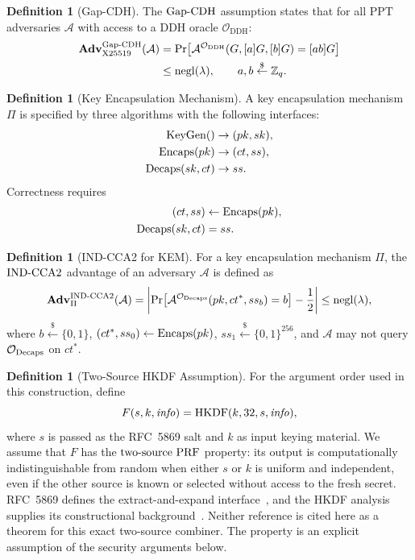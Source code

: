 \documentclass[preprint,12pt]{elsarticle}
\theoremstyle{definition}
\newtheorem{definition}[theorem]{Definition}
\newcommand{\tech}[1]{\textnormal{#1}}
\newcommand{\secpar}{\lambda}
\newcommand{\negl}{\mathrm{negl}}
\newcommand{\ppt}{\mathrm{PPT}}
\newcommand{\adv}{\mathbf{Adv}}
\newcommand{\advA}{\mathcal{A}}
\newcommand{\oracle}{\mathcal{O}}
\newcommand{\HKDF}{\tech{HKDF}}
\renewcommand{\DH}{\tech{X25519}}
\newcommand{\KeyGen}{\tech{KeyGen}}
\newcommand{\Encaps}{\tech{Encaps}}
\newcommand{\Decaps}{\tech{Decaps}}
\newcommand{\GapCDH}{\tech{Gap-CDH}}
\newcommand{\INDCCA}{\tech{IND-CCA2}}
\newcommand{\twoSourcePRF}{\tech{two-source PRF}}
\newcommand{\getsr}{\stackrel{\$}{\gets}}
\begin{document}
\begin{definition}[Gap-CDH]\label{def:gap-cdh}
The $\GapCDH$ assumption states that for all $\ppt$ adversaries $\advA$ with access to a DDH oracle $\oracle_{\mathrm{DDH}}$:
\begin{align}
  \adv^{\GapCDH}_{\DH}(\advA)
  &=
  \Pr\!\left[
    \advA^{\oracle_{\mathrm{DDH}}}(G,[a]G,[b]G) = [ab]G
  \right] \notag\\
  &\leq \negl(\secpar),
  \qquad a,b \getsr \mathbb{Z}_q .
  \label{eq:gap-cdh}
\end{align}
\end{definition}

\begin{definition}[Key Encapsulation Mechanism]\label{def:kem}
A key encapsulation mechanism $\Pi$ is specified by three algorithms with the following interfaces:
\[
  \begin{aligned}
    \KeyGen() &\to (pk, sk),\\
    \Encaps(pk) &\to (ct, ss),\\
    \Decaps(sk, ct) &\to ss.
  \end{aligned}
\]
Correctness requires
\[
  \begin{aligned}
    (ct, ss) &\gets \Encaps(pk),\\
    \Decaps(sk, ct) &= ss.
  \end{aligned}
\]
\end{definition}

\begin{definition}[IND-CCA2 for KEM]\label{def:ind-cca2}
For a key encapsulation mechanism $\Pi$, the $\INDCCA$ advantage of an adversary $\advA$ is defined as
\begin{equation}\label{eq:kem-ind-cca}
  \adv^{\INDCCA}_\Pi(\advA) = \left|\Pr\!\left[\advA^{\oracle_{\Decaps}}(pk, ct^*, ss_b) = b\right] - \frac{1}{2}\right| \leq \negl(\secpar),
\end{equation}
where $b \getsr \{0,1\}$, $(ct^*, ss_0) \gets \Encaps(pk)$, $ss_1 \getsr \{0,1\}^{256}$, and $\advA$ may not query $\oracle_{\Decaps}$ on $ct^*$.
\end{definition}

\begin{definition}[Two-Source HKDF Assumption]\label{def:dual-prf}
For the argument order used in this construction, define
\[
  F(s,k,\mathit{info}) = \HKDF(k,32,s,\mathit{info}),
\]
where $s$ is passed as the RFC~5869 salt and $k$ as input keying
material. We assume that $F$ has the $\twoSourcePRF$ property: its output is
computationally indistinguishable from random when either $s$ or $k$ is uniform
and independent, even if the other source is known or selected without access
to the fresh secret. RFC~5869 defines the extract-and-expand
interface~\cite{rfc5869}, and the HKDF analysis supplies its constructional
background~\cite{krawczyk2010}. Neither reference is cited here as a theorem for
this exact two-source combiner. The property is an explicit assumption of the
security arguments below.
\end{definition}
\end{document}
